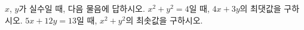 $x$, $y$가 실수일 때, 다음 물음에 답하시오.
 $x^2+y^2=4$일 때, $4x+3y$의 최댓값을 구하시오.
 $5x+12y=13$일 때, $x^2+y^2$의 최솟값을 구하시오.
